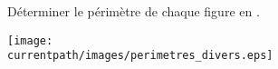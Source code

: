 \begin{exercice}
    Déterminer le périmètre de chaque figure en \ucm{}. \smallskip
    \begin{center}
       \texttt{[image: \\currentpath/images/perimetres\_divers.eps]}
    \end{center}   
 \end{exercice}